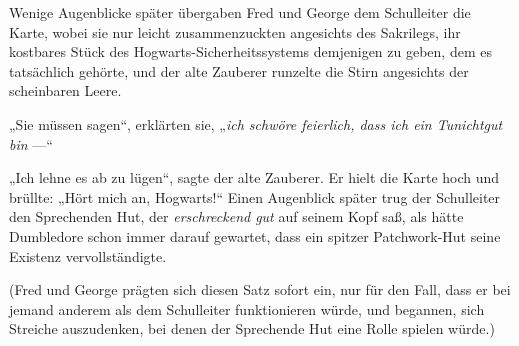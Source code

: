 Wenige Augenblicke später übergaben Fred und George dem Schulleiter die Karte, wobei sie nur leicht zusammenzuckten angesichts des Sakrilegs, ihr kostbares Stück des Hogwarts-Sicherheitssystems demjenigen zu geben, dem es tatsächlich gehörte, und der alte Zauberer runzelte die Stirn angesichts der scheinbaren Leere.

„Sie müssen sagen“, erklärten sie,
„\emph{ich schwöre feierlich, dass ich ein Tunichtgut bin} —“

„Ich lehne es ab zu lügen“, sagte der alte Zauberer. Er hielt die Karte hoch und brüllte:
„Hört mich an, Hogwarts!“ 
Einen Augenblick später trug der Schulleiter den Sprechenden Hut, der \emph{erschreckend gut} auf seinem Kopf saß, als hätte Dumbledore schon immer darauf gewartet, dass ein spitzer Patchwork-Hut seine Existenz vervollständigte.

(Fred und George prägten sich diesen Satz sofort ein, nur für den Fall, dass er bei jemand anderem als dem Schulleiter funktionieren würde, und begannen, sich Streiche auszudenken, bei denen der Sprechende Hut eine Rolle spielen würde.)

